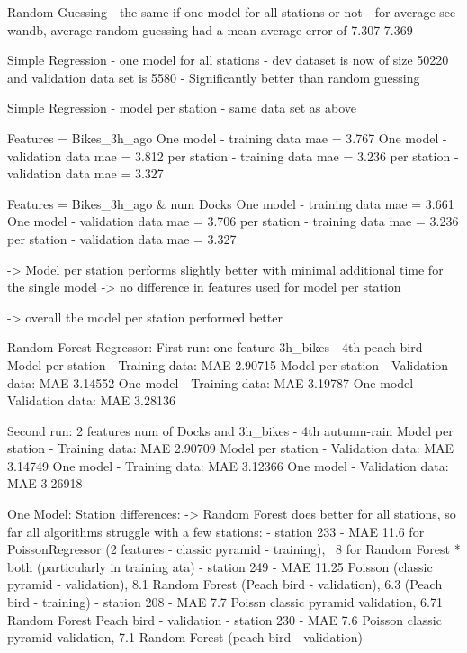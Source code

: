 \documentclass{article}
\begin{document}
{{{{{{{        Random Guessing - the same if one model for all stations or not
        - for average see wandb, average random guessing had a mean average error of 7.307-7.369

        Simple Regression - one model for all stations
        - dev dataset is now of size 50220 and validation data set is 5580
        - Significantly better than random guessing

        Simple Regression - model per station
        - same data set as above

            Features = Bikes_3h_ago
            One model - training data mae = 3.767
            One model - validation data mae = 3.812
            per station - training data mae = 3.236
            per station - validation data mae = 3.327

            Features = Bikes_3h_ago & num Docks
            One model - training data mae = 3.661
            One model - validation data mae = 3.706
            per station - training data mae = 3.236
            per station - validation data mae = 3.327

        -> Model per station performs slightly better with minimal additional time for the single model
        -> no difference in features used for model per station

        -> overall the model per station performed better

        Random Forest Regressor:
        First run: one feature 3h_bikes - 4th peach-bird
        Model per station - Training data: MAE 2.90715
        Model per station - Validation data: MAE 3.14552
        One model - Training data: MAE 3.19787
        One model - Validation data: MAE 3.28136

        Second run: 2 features num of Docks and 3h_bikes - 4th autumn-rain
        Model per station - Training data: MAE 2.90709
        Model per station - Validation data: MAE 3.14749
        One model - Training data: MAE 3.12366
        One model - Validation data: MAE 3.26918

        One Model:
        Station differences:
        -> Random Forest does better for all stations, so far all algorithms struggle with a few stations:
        - station 233 - MAE 11.6 for PoissonRegressor (2 features - classic pyramid - training), ~8 for Random Forest * both (particularly in training ata)
        - station 249 - MAE 11.25 Poisson (classic pyramid - validation), 8.1 Random Forest (Peach bird - validation),
                        6.3 (Peach  bird - training)
        - station 208 - MAE 7.7 Poissn classic pyramid validation, 6.71 Random Forest Peach bird - validation
        - station 230 - MAE 7.6 Poisson classic pyramid validation, 7.1 Random Forest (peach bird - validation)

}}}}}}}
\end{document}
